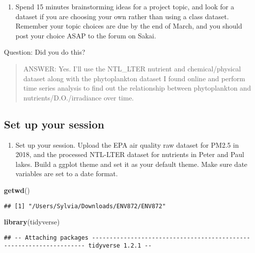 \documentclass[]{article}
\newenvironment{Shaded}{\begin{snugshade}}{\end{snugshade}}
\newcommand{\KeywordTok}[1]{\textcolor[rgb]{0.13,0.29,0.53}{\textbf{#1}}}
\newcommand{\NormalTok}[1]{#1}
\providecommand{\tightlist}{%
  \setlength{\itemsep}{0pt}\setlength{\parskip}{0pt}}
\begin{document}
\begin{enumerate}
\def\labelenumi{\arabic{enumi}.}
\tightlist
\item
  Spend 15 minutes brainstorming ideas for a project topic, and look for
  a dataset if you are choosing your own rather than using a class
  dataset. Remember your topic choices are due by the end of March, and
  you should post your choice ASAP to the forum on Sakai.
\end{enumerate}

Question: Did you do this?

\begin{quote}
ANSWER: Yes. I'll use the NTL\_LTER nutrient and chemical/physical
dataset along with the phytoplankton dataset I found online and perform
time series analysis to find out the relationship between phytoplankton
and nutrients/D.O./irradiance over time.
\end{quote}

\subsection{Set up your session}\label{set-up-your-session}

\begin{enumerate}
\def\labelenumi{\arabic{enumi}.}
\setcounter{enumi}{1}
\tightlist
\item
  Set up your session. Upload the EPA air quality raw dataset for PM2.5
  in 2018, and the processed NTL-LTER dataset for nutrients in Peter and
  Paul lakes. Build a ggplot theme and set it as your default theme.
  Make sure date variables are set to a date format.
\end{enumerate}

\begin{Shaded}
\begin{Highlighting}[]
\KeywordTok{getwd}\NormalTok{()}
\end{Highlighting}
\end{Shaded}

\begin{verbatim}
## [1] "/Users/Sylvia/Downloads/ENV872/ENV872"
\end{verbatim}

\begin{Shaded}
\begin{Highlighting}[]
\KeywordTok{library}\NormalTok{(tidyverse)}
\end{Highlighting}
\end{Shaded}

\begin{verbatim}
## -- Attaching packages -------------------------------------------------------------------- tidyverse 1.2.1 --
\end{verbatim}
\end{document}
